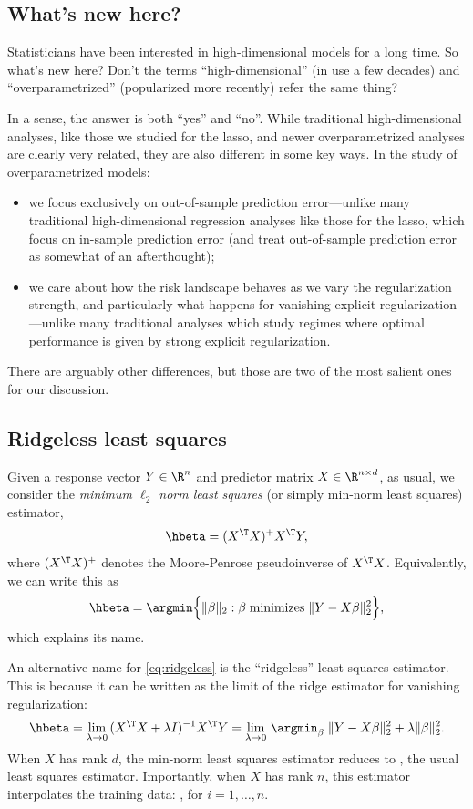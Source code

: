 \documentclass{article}
\begin{document}
\subsection{What's new here?}

Statisticians have been interested in high-dimensional models for a long
time. So what's new here? Don't the terms ``high-dimensional'' (in use a few
decades) and ``overparametrized'' (popularized more recently) refer the same
thing?     

In a sense, the answer is both ``yes'' and ``no''. While traditional
high-dimensional analyses, like those we studied for the lasso, and newer
overparametrized analyses are clearly very related, they are also different in
some key ways. In the study of overparametrized models:
\begin{itemize}
\item we focus exclusively on out-of-sample prediction error---unlike many 
  traditional high-dimensional regression analyses like those for the lasso,
  which focus on in-sample prediction error (and treat out-of-sample
  prediction error as somewhat of an afterthought);  
\item we care about how the risk landscape behaves as we vary the regularization  
  strength, and particularly what happens for vanishing explicit
  regularization---unlike many traditional analyses which study regimes where
  optimal performance is given by strong explicit regularization.   
\end{itemize}
There are arguably other differences, but those are two of the most salient ones 
for our discussion.

\subsection{Ridgeless least squares}

Given a response vector $Y \in \R^n$ and predictor matrix $X \in \R^{n \times
  d}$, as usual, we consider the \emph{minimum $\ell_2$ norm least squares} 
(or simply min-norm least squares) estimator,
\begin{equation}
\label{eq:ridgeless}
\hbeta = (X^\T X)^+ X^\T Y,
\end{equation}
where $(X^\T X)^+$ denotes the Moore-Penrose pseudoinverse of $X^\T X$.
Equivalently, we can write this as
\[
\hbeta = \argmin \Big\{ \|\beta\|_2 : \beta \; \text{minimizes} \; \|Y - X
\beta\|_2^2 \Big\},   
\]
which explains its name.  

An alternative name for \eqref{eq:ridgeless} is the ``ridgeless'' least squares 
estimator. This is because it can be written as the limit of the ridge estimator
for vanishing regularization:  
\[
\hbeta = \lim_{\lambda \to 0} \, (X^\T X + \lambda I)^{-1} X^\T Y =   
\lim_{\lambda \to 0} \, \argmin_\beta \; \|Y - X\beta\|_2^2 + \lambda 
\|\beta\|_2^2.   
\]
When $X$ has rank $d$, the min-norm least squares estimator reduces to
, the usual least squares estimator.
Importantly, when $X$ has rank $n$, this estimator interpolates the training 
data: , for $i=1,\dots,n$.   
\end{document}
